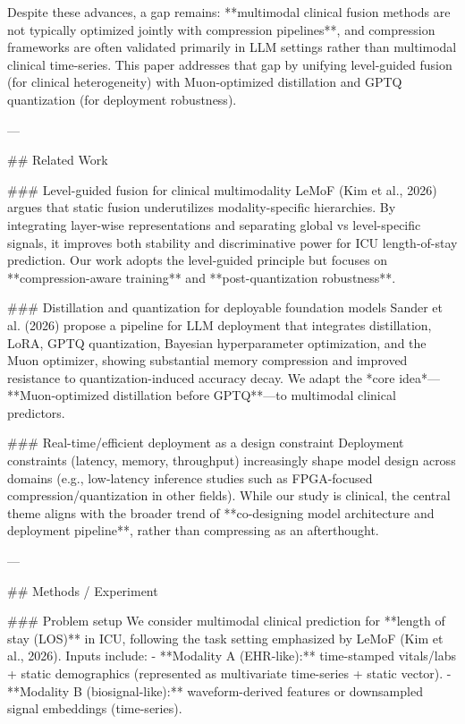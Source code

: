 Despite these advances, a gap remains: **multimodal clinical fusion methods are not typically optimized jointly with compression pipelines**, and compression frameworks are often validated primarily in LLM settings rather than multimodal clinical time-series. This paper addresses that gap by unifying level-guided fusion (for clinical heterogeneity) with Muon-optimized distillation and GPTQ quantization (for deployment robustness).

---

## Related Work  

### Level-guided fusion for clinical multimodality  
LeMoF (Kim et al., 2026) argues that static fusion underutilizes modality-specific hierarchies. By integrating layer-wise representations and separating global vs level-specific signals, it improves both stability and discriminative power for ICU length-of-stay prediction. Our work adopts the level-guided principle but focuses on **compression-aware training** and **post-quantization robustness**.

### Distillation and quantization for deployable foundation models  
Sander et al. (2026) propose a pipeline for LLM deployment that integrates distillation, LoRA, GPTQ quantization, Bayesian hyperparameter optimization, and the Muon optimizer, showing substantial memory compression and improved resistance to quantization-induced accuracy decay. We adapt the *core idea*—**Muon-optimized distillation before GPTQ**—to multimodal clinical predictors.

### Real-time/efficient deployment as a design constraint  
Deployment constraints (latency, memory, throughput) increasingly shape model design across domains (e.g., low-latency inference studies such as FPGA-focused compression/quantization in other fields). While our study is clinical, the central theme aligns with the broader trend of **co-designing model architecture and deployment pipeline**, rather than compressing as an afterthought.

---

## Methods / Experiment  

### Problem setup  
We consider multimodal clinical prediction for **length of stay (LOS)** in ICU, following the task setting emphasized by LeMoF (Kim et al., 2026). Inputs include:
- **Modality A (EHR-like):** time-stamped vitals/labs + static demographics (represented as multivariate time-series + static vector).  
- **Modality B (biosignal-like):** waveform-derived features or downsampled signal embeddings (time-series).

